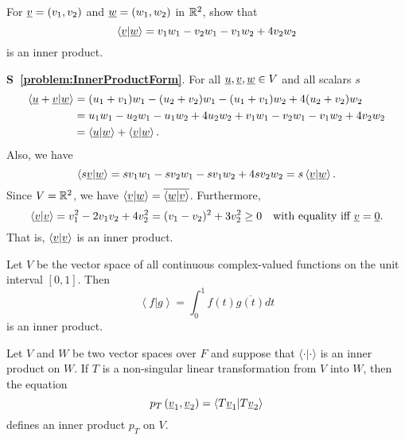 \begin{problem} \label{problem:InnerProductForm}
For $\underline{v} = (v_1, v_2)$ and $\underline{w} = (w_1, w_2)$  in $\mathbb{R}^2$, show that
\begin{equation*}
\left\langle \underline{v} | \underline{w} \right\rangle
= v_1 w_1 - v_2 w_1 - v_1 w_2 + 4 v_2 w_2
\end{equation*}
is an inner product.
\end{problem}
\noindent \textbf{S~\ref{problem:InnerProductForm}}.
For all $\underline{u}, \underline{v}, \underline{w} \in V$ and all scalars $s$
\begin{equation*}
\begin{split}
\left\langle \underline{u} + \underline{v} | \underline{w} \right\rangle
&= (u_1 + v_1) w_1 - (u_2 + v_2) w_1 - (u_1 + v_1) w_2 + 4 (u_2 + v_2) w_2 \\
&= u_1 w_1 - u_2 w_1 - u_1 w_2 + 4 u_2 w_2
+ v_1 w_1 - v_2 w_1 - v_1 w_2 + 4 v_2 w_2 \\
&= \left\langle \underline{u} | \underline{w} \right\rangle
+ \left\langle \underline{v} | \underline{w} \right\rangle.
\end{split}
\end{equation*}
Also, we have
\begin{equation*}
\left\langle s \underline{v} | \underline{w} \right\rangle
= s v_1 w_1 - s v_2 w_1 - s v_1 w_2 + 4 s v_2 w_2
= s \left\langle \underline{v} | \underline{w} \right\rangle.
\end{equation*}
Since $V = \mathbb{R}^2$, we have $\left\langle \underline{v} | \underline{w} \right\rangle = \overline{ \left\langle \underline{w} | \underline{v} \right\rangle }$.
Furthermore,
\begin{equation*}
\left\langle \underline{v} | \underline{v} \right\rangle
= v_1^2 - 2 v_1 v_2 + 4 v_2^2
= ( v_1 - v_2 )^2 + 3 v_2^2
\geq 0
\quad \text{with equality iff } \underline{v} = \underline{0}.
\end{equation*}
That is, $\left\langle \underline{v} | \underline{v} \right\rangle$ is an inner product.


\begin{example}
Let $V$ be the vector space of all continuous complex-valued functions on the unit interval $[0,1]$.
Then
\begin{equation*}
\left\langle f | g \right\rangle
= \int_0^1 f(t) \overline{g(t)} dt
\end{equation*}
is an inner product.
\end{example}

\begin{example}
Let $V$ and $W$ be two vector spaces over $F$ and suppose that $\langle \cdot | \cdot \rangle$ is an inner product on $W$.
If $T$ is a non-singular linear transformation from $V$ into $W$, then the equation
\begin{equation*}
p_T \left( \underline{v}_1, \underline{v}_2 \right)
= \left\langle T \underline{v}_1 | T \underline{v}_2 \right\rangle
\end{equation*}
defines an inner product $p_T$ on $V$.
\end{example}

